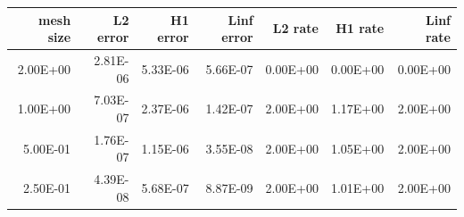 \begin{tabular}{rrrrrrr}
\toprule
mesh size & L2 error & H1 error & Linf error & L2 rate & H1 rate & Linf rate \\
\midrule
2.00E+00 & 2.81E-06 & 5.33E-06 & 5.66E-07 & 0.00E+00 & 0.00E+00 & 0.00E+00 \\
1.00E+00 & 7.03E-07 & 2.37E-06 & 1.42E-07 & 2.00E+00 & 1.17E+00 & 2.00E+00 \\
5.00E-01 & 1.76E-07 & 1.15E-06 & 3.55E-08 & 2.00E+00 & 1.05E+00 & 2.00E+00 \\
2.50E-01 & 4.39E-08 & 5.68E-07 & 8.87E-09 & 2.00E+00 & 1.01E+00 & 2.00E+00 \\
\bottomrule
\end{tabular}
